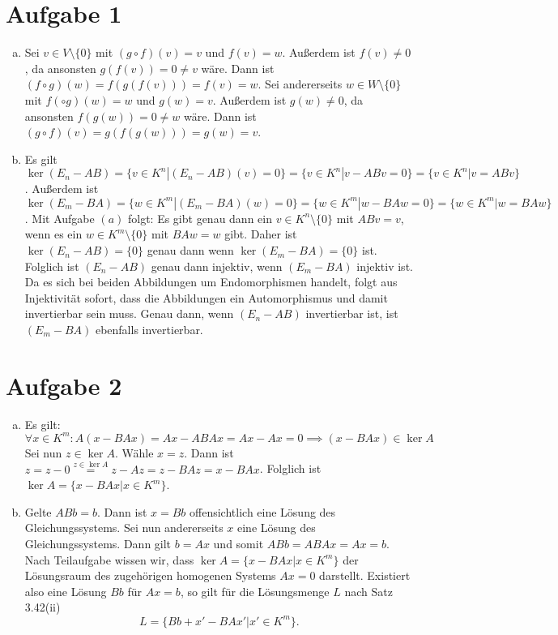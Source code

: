\documentclass{article}
\begin{document}
    \section*{Aufgabe 1}
    \begin{enumerate}[(a)]
        \item Sei $v\in V \setminus \{0\}$ mit $(g\circ f)(v) = v$ und $f(v) = w$. Außerdem ist $f(v) \neq 0$, da ansonsten $g(f(v)) = 0 \neq v$ wäre. Dann ist $(f\circ g)(w) = f(g(f(v))) = f(v) = w$. Sei andererseits $w\in W \setminus \{0\}$ mit $f(\circ g)(w) = w$ und $g(w) = v$. Außerdem ist $g(w) \neq 0$, da ansonsten $f(g(w)) = 0 \neq w$ wäre. Dann ist $(g\circ f)(v) = g(f(g(w))) = g(w) = v$.
        \item Es gilt $\ker(E_n - AB) = \{v \in K^n|(E_n - AB)(v) = 0\} = \{v \in K^n|v - ABv = 0\} = \{v \in K^n| v = ABv\}$.
        Außerdem ist $\ker(E_m - BA) = \{w\in K^m|(E_m - BA)(w) = 0\} = \{w \in K^m|w - BAw = 0\} = \{w\in K^m| w = BAw\}$.
        Mit Aufgabe $(a)$ folgt: Es gibt genau dann ein $v\in K^n\setminus\{0\}$ mit $ABv = v$, wenn es ein $w\in K^m\setminus\{0\}$ mit $BAw = w$ gibt. Daher ist $\ker(E_n - AB) = \{0\}$ genau dann wenn $\ker(E_m - BA) = \{0\}$ ist. Folglich ist $(E_n - AB)$ genau dann injektiv, wenn $(E_m - BA)$ injektiv ist. Da es sich bei beiden Abbildungen um Endomorphismen handelt, folgt aus Injektivität sofort, dass die Abbildungen ein Automorphismus und damit invertierbar sein muss. Genau dann, wenn $(E_n - AB)$ invertierbar ist, ist $(E_m - BA)$ ebenfalls invertierbar.
    \end{enumerate}
    \section*{Aufgabe 2}
    \begin{enumerate}[(a)]
        \item Es gilt:
        $$\forall x \in K^m: A(x - BAx) = Ax - ABAx = Ax - Ax = 0 \implies (x - BAx) \in \ker A$$
        Sei nun $z \in \ker A$. Wähle $x = z$. Dann ist $z = z - 0 \overset{z\in \ker A}{=} z - Az = z - BAz  =x - BAx$.
        Folglich ist $\ker A = \{x - BAx | x \in K^m\}$.
        \item Gelte $ABb = b$. Dann ist $x = Bb$ offensichtlich eine Lösung des Gleichungssystems.
        Sei nun andererseits $x$ eine Lösung des Gleichungssystems. Dann gilt $b = Ax$ und somit $ABb = ABAx = Ax = b$. Nach Teilaufgabe wissen wir, dass $\ker A = \{x - BAx | x \in K^m\}$ der Lösungsraum des zugehörigen homogenen Systems $Ax = 0$ darstellt.
        Existiert also eine Lösung $Bb$ für $Ax = b$, so gilt für die Lösungsmenge $L$ nach Satz 3.42(ii) $$L = \{Bb + x' - BAx'|x' \in K^m\}.$$
    \end{enumerate}
\end{document}
